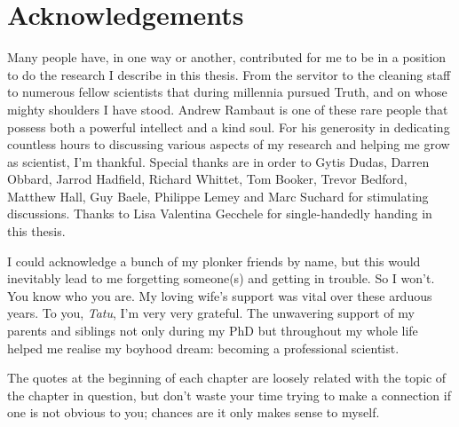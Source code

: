 \chapter{Acknowledgements}

Many people have, in one way or another, contributed for me to be in a position to do the research I describe in this thesis.
From the servitor to the cleaning staff to numerous fellow scientists that during millennia pursued Truth, and on whose mighty shoulders I have stood.
Andrew Rambaut is one of these rare people that possess both a powerful intellect and a kind soul.
For his generosity in dedicating countless hours to discussing various aspects of my research and helping me grow as scientist, I'm thankful.
Special thanks are in order to Gytis Dudas, Darren Obbard, Jarrod Hadfield, Richard Whittet, Tom Booker, Trevor Bedford, Matthew Hall, Guy Baele, Philippe Lemey and Marc Suchard for stimulating discussions.
Thanks to Lisa Valentina Gecchele for single-handedly handing in this thesis.

I could acknowledge a bunch of my plonker friends by name, but this would inevitably lead to me forgetting someone(s) and getting in trouble.
So I won't.
You know who you are.
My loving wife's support was vital over these arduous years.
To you, \textit{Tatu}, I'm very very grateful.
The unwavering support of my parents and siblings not only during my PhD but throughout my whole life helped me realise my boyhood dream: becoming a professional scientist.

The quotes at the beginning of each chapter are loosely related with the topic of the chapter in question, but don't waste your time trying to make a connection if one is not obvious to you; chances are it only makes sense to myself.
